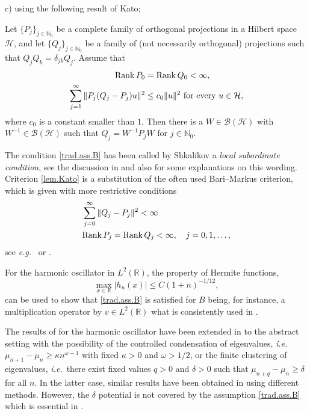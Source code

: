 \noindent
c) using the following result of Kato; 
\begin{criterion}\label{lem.Kato}
Let $\{P_j\}_{j\in{\mathbb{N}}_0}$ be a complete family of orthogonal projections in a Hilbert space ${{\mathcal{H}}}$, and let $\{Q_j\}_{j\in{\mathbb{N}}_0}$ be a family of (not necessarily orthogonal) projections such that $Q_jQ_k = \delta_{jk}Q_j$. Assume that
\begin{equation*}
\begin{aligned}
{\rm Rank} \, P_0 &= {\rm Rank} \, Q_0 < \infty, \\
\sum_{j=1}^{\infty} \|P_j(Q_j-P_j) u\|^2 &\leq c_0 \|u\|^2 \ {\rm for \ every \ } u \in {{\mathcal{H}}},
\end{aligned}
\end{equation*}
where $c_0$ is a constant smaller than $1$. Then there is a $W \in {\mathscr{B}(\mathcal{H})}$ with $W^{-1} \in {\mathscr{B}(\mathcal{H})}$ such that $Q_j=W^{-1} P_j W$ for $j \in {\mathbb{N}}_0$.
\end{criterion}

The condition \eqref{trad.ass.B} has been called by Shkalikov a \emph{local subordinate condition}, see the discussion in \cite{Shkalikov-2012-18} and also \cite[Sec.1]{Adduci-2012-73} for some explanations on this wording. 
Criterion \ref{lem.Kato} is a substitution of the often used Bari--Markus criterion, which is given with more restrictive conditions 
\begin{equation*}
\begin{aligned}
&\sum_{j=0}^\infty \| Q_j -P_j\|^2 < \infty \\
&{\rm Rank} \, P_j = {\rm Rank} \, Q_j < \infty, \quad j=0,1,\dots,
\end{aligned}
\end{equation*}
see {{\emph{e.g.}}}~\cite[Chap.6, Sec. 5.3, Thm. 5.2]{Gohberg-1969} or \cite{Markus-1988}.

For the harmonic oscillator in $L^2({{\mathbb{R}}})$, the property of Hermite functions, 
\begin{equation*}
\max_{x \in {{\mathbb{R}}}} |h_n(x)| \leq C (1+n)^{-1/12},
\end{equation*}
can be used to show that \eqref{trad.ass.B} is satisfied for $B$ being, for instance, a multiplication operator by $v \in L^2({{\mathbb{R}}})$ what is consistently used in \cite{Adduci-2012-10}.

The results of \cite{Adduci-2012-10} for the harmonic oscillator have been extended in \cite{Adduci-2012-73} to the abstract setting with the possibility of the controlled condensation of eigenvalues, {{\emph{i.e.}}}~$\mu_{n+1} -\mu_n \geq \kappa n^{\omega-1}$ with fixed $\kappa >0$ and $\omega >1/2$, or the finite clustering of eigenvalues, {{\emph{i.e.}}}~there exist fixed values $q>0$ and $\delta>0$ such that $\mu_{n+q}-\mu_n \geq \delta$ for all $n$. In the latter case, similar results have been obtained in \cite{Shkalikov-2010-269} using different methods. However, the $\delta$ potential is not covered by the assumption \eqref{trad.ass.B} which is essential in \cite{Adduci-2012-10, Adduci-2012-73, Shkalikov-2010-269}.

